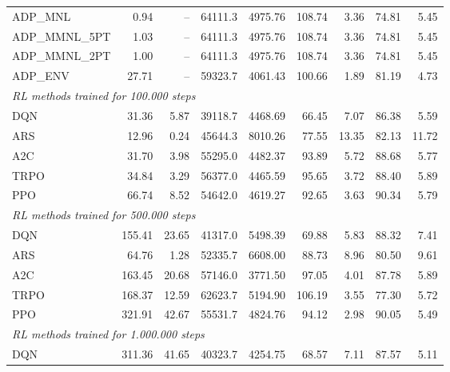 \begin{samepage}
\begin{center}
\begin{tabular}{l|rr|rr|rr|rr}
    \midrule
    ADP\_MNL     &     0.94 &    -- &    64111.3 &    4975.76 &  108.74 &    3.36 &   74.81 &    5.45 \\
    ADP\_MMNL\_5PT &     1.03 &    -- &    64111.3 &    4975.76 &  108.74 &    3.36 &   74.81 &    5.45 \\
    ADP\_MMNL\_2PT &     1.00 &    -- &    64111.3 &    4975.76 &  108.74 &    3.36 &   74.81 &    5.45 \\
    ADP\_ENV     &    27.71 &    -- &    59323.7 &    4061.43 &  100.66 &    1.89 &   81.19 &    4.73 \\
    \midrule
    \multicolumn{9}{l}{\textit{RL methods trained for 100.000 steps}} \\
    \midrule
    DQN          &    31.36 &     5.87 &    39118.7 &    4468.69 &   66.45 &    7.07 &   86.38 &    5.59 \\
    ARS          &    12.96 &     0.24 &    45644.3 &    8010.26 &   77.55 &   13.35 &   82.13 &   11.72 \\
    A2C          &    31.70 &     3.98 &    55295.0 &    4482.37 &   93.89 &    5.72 &   88.68 &    5.77 \\
    TRPO         &    34.84 &     3.29 &    56377.0 &    4465.59 &   95.65 &    3.72 &   88.40 &    5.89 \\
    PPO          &    66.74 &     8.52 &    54642.0 &    4619.27 &   92.65 &    3.63 &   90.34 &    5.79 \\
    \midrule
    \multicolumn{9}{l}{\textit{RL methods trained for 500.000 steps}} \\
    \midrule
    DQN          &   155.41 &    23.65 &    41317.0 &    5498.39 &   69.88 &    5.83 &   88.32 &    7.41 \\
    ARS          &    64.76 &     1.28 &    52335.7 &    6608.00 &   88.73 &    8.96 &   80.50 &    9.61 \\
    A2C          &   163.45 &    20.68 &    57146.0 &    3771.50 &   97.05 &    4.01 &   87.78 &    5.89 \\
    TRPO         &   168.37 &    12.59 &    62623.7 &    5194.90 &  106.19 &    3.55 &   77.30 &    5.72 \\
    PPO          &   321.91 &    42.67 &    55531.7 &    4824.76 &   94.12 &    2.98 &   90.05 &    5.49 \\
    \midrule
    \multicolumn{9}{l}{\textit{RL methods trained for 1.000.000 steps}} \\
    \midrule
    DQN          &   311.36 &    41.65 &    40323.7 &    4254.75 &   68.57 &    7.11 &   87.57 &    5.11 \\

\end{tabular}
\end{center}
\end{samepage}
